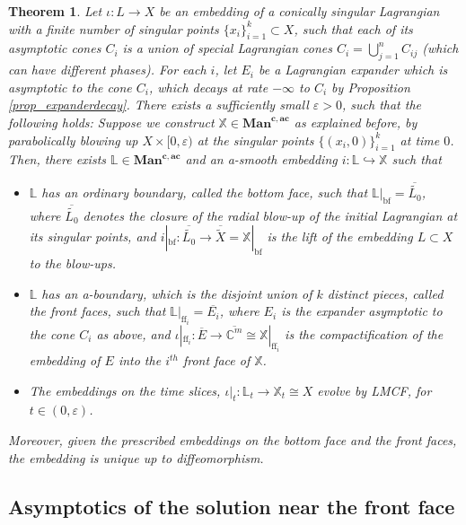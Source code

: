 \documentclass[10pt, a4paper]{article}
\theoremstyle{plain}%
\newtheorem{theorem}{Theorem}[section]
\theoremstyle{definition}
\numberwithin{figure}{section}
\numberwithin{equation}{section}
\newcommand{\bL}{\mathbb{L}}
\newcommand{\bX}{\mathbb{X}}
\newcommand{\bC}{\mathbb{C}}
\newcommand{\rt}{\rightarrow}
\newcommand{\mancac}{\mathbf{Man}^{\mathbf{c,ac}}}
\newcommand{\ep}{\varepsilon}
\begin{document}
\begin{theorem}\label{thm_main}
	Let $\iota: L \rt X$ be an embedding of a conically singular Lagrangian with a finite number of singular points $\{x_i\}_{i=1}^k\subset X$, such that each of its asymptotic cones $C_i$ is a union of special Lagrangian cones $C_i=\bigcup_{j=1}^n C_{ij}$ (which can have different phases). For each $i$, let $E_i$ be a Lagrangian expander which is asymptotic to the cone $C_i$, which decays at rate $-\infty$ to $C_i$ by Proposition \ref{prop_expanderdecay}. There exists a sufficiently small $\ep>0$, such that the following holds: Suppose we construct $\bX\in \mancac$ as explained before, by parabolically blowing up $X\times[0,\varepsilon)$ at the singular points $\{(x_i,0)\}_{i=1}^k$ at time $0$. Then, there exists $\bL\in\mancac$ and an a-smooth embedding $i:\bL\hookrightarrow\bX$ such that\begin{itemize}
		\item $\bL$ has an ordinary boundary, called the bottom face, such that $\bL|_{\mathrm{bf}}=\overline{\widetilde{L_0}}$, where $\overline{\widetilde{L_0}}$ denotes the closure of the radial blow-up of the initial Lagrangian at its singular points, and $i|_{\mathrm{bf}}:\overline{\widetilde{L_0}}\rt \overline{\widetilde{X}}=\bX|_{\mathrm{bf}}$ is the lift of the embedding $L\subset X$ to the blow-ups. 
		\item $\bL$ has an a-boundary, which is the disjoint union of $k$ distinct pieces, called the front faces, such that $\bL|_{\mathrm{ff}_i}=\overline{E_i}$, where $E_i$ is the expander asymptotic to the cone $C_i$ as above, and $\iota|_{\mathrm{ff}_i}: \overline{E} \rt \overline{\bC^m}\cong \bX|_{\mathrm{ff}_i}$ is the compactification of the embedding of $E$ into the $i^{th}$ front face of $\bX$.
		\item The embeddings on the time slices, $\iota|_{t}:\bL_t\rt \bX_t\cong X$  evolve by LMCF, for $t\in(0,\varepsilon)$.
	\end{itemize}
	Moreover, given the prescribed embeddings on the bottom face and the front faces, the embedding is unique up to diffeomorphism.
\end{theorem}


\subsection{Asymptotics of the solution near the front face}\label{sec_polyhomogeneouscon}
\end{document}
